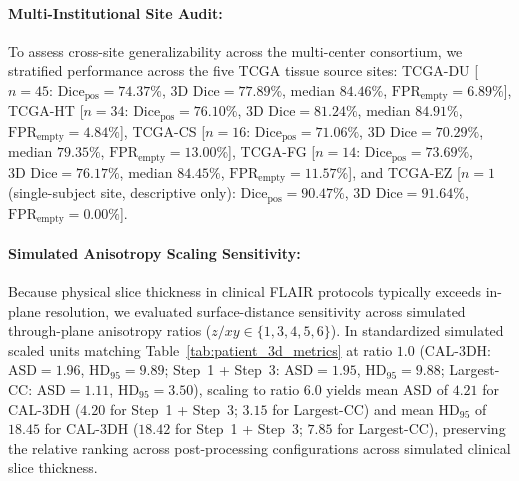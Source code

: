 \documentclass[11pt,a4paper]{article}
\begin{document}
\paragraph{Multi-Institutional Site Audit:}
To assess cross-site generalizability across the multi-center consortium, we stratified performance across the five TCGA tissue source sites: TCGA-DU [$n=45$: $\text{Dice}_{\text{pos}} = 74.37\%$, $\text{3D Dice} = 77.89\%$, median $84.46\%$, $\text{FPR}_{\text{empty}} = 6.89\%$], TCGA-HT [$n=34$: $\text{Dice}_{\text{pos}} = 76.10\%$, $\text{3D Dice} = 81.24\%$, median $84.91\%$, $\text{FPR}_{\text{empty}} = 4.84\%$], TCGA-CS [$n=16$: $\text{Dice}_{\text{pos}} = 71.06\%$, $\text{3D Dice} = 70.29\%$, median $79.35\%$, $\text{FPR}_{\text{empty}} = 13.00\%$], TCGA-FG [$n=14$: $\text{Dice}_{\text{pos}} = 73.69\%$, $\text{3D Dice} = 76.17\%$, median $84.45\%$, $\text{FPR}_{\text{empty}} = 11.57\%$], and TCGA-EZ [$n=1$ (single-subject site, descriptive only): $\text{Dice}_{\text{pos}} = 90.47\%$, $\text{3D Dice} = 91.64\%$, $\text{FPR}_{\text{empty}} = 0.00\%$].

\paragraph{Simulated Anisotropy Scaling Sensitivity:}
Because physical slice thickness in clinical FLAIR protocols typically exceeds in-plane resolution, we evaluated surface-distance sensitivity across simulated through-plane anisotropy ratios ($z/xy \in \{1, 3, 4, 5, 6\}$). In standardized simulated scaled units matching Table~\ref{tab:patient_3d_metrics} at ratio $1.0$ (CAL-3DH: $\text{ASD} = 1.96$, $\text{HD}_{95} = 9.89$; Step~1 + Step~3: $\text{ASD} = 1.95$, $\text{HD}_{95} = 9.88$; Largest-CC: $\text{ASD} = 1.11$, $\text{HD}_{95} = 3.50$), scaling to ratio $6.0$ yields mean ASD of $4.21$ for CAL-3DH ($4.20$ for Step~1 + Step~3; $3.15$ for Largest-CC) and mean $\text{HD}_{95}$ of $18.45$ for CAL-3DH ($18.42$ for Step~1 + Step~3; $7.85$ for Largest-CC), preserving the relative ranking across post-processing configurations across simulated clinical slice thickness.
\end{document}
